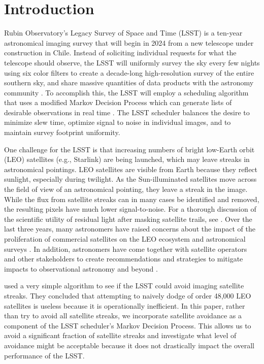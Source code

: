 \documentclass[twocolumn]{aastex631}
\begin{document}
\section{Introduction} \label{sec:intro}

Rubin Observatory's Legacy Survey of Space and Time (LSST) is a ten-year astronomical imaging survey that will begin in 2024 from a new telescope under construction in Chile. Instead of soliciting individual requests for what the telescope should observe, the LSST will uniformly survey the sky every few nights using six color filters to create a decade-long high-resolution survey of the entire southern sky, and share massive quantities of data products with the astronomy community \citep{overview}. To accomplish this, the LSST will employ a scheduling algorithm that uses a modified Markov Decision Process which can generate lists of desirable observations in real time \citep{naghib19}. The LSST scheduler balances the desire to minimize slew time, optimize signal to noise in individual images, and to maintain survey footprint uniformity.

One challenge for the LSST is that increasing numbers of bright low-Earth orbit (LEO) satellites (e.g., Starlink) are being launched, which may leave streaks in astronomical pointings. LEO satellites are visible from Earth because they reflect sunlight, especially during twilight. As the Sun-illuminated satellites move across the field of view of an astronomical pointing, they leave a streak in the image. While the flux from satellite streaks can in many cases be identified and removed, the resulting pixels have much lower signal-to-noise. For a thorough discussion of the scientific utility of residual light after masking satellite trails, see \citet{hasan22}. Over the last three years, many astronomers have raised concerns about the impact of the proliferation of commercial satellites on the LEO ecosystem and astronomical surveys \citep{lawrence22,tyson20}. In addition, astronomers have come together with satellite operators and other stakeholders to create recommendations and strategies to mitigate impacts to observational astronomy and beyond \citep{satcon1,satcon2,dqs1,dqs2}.

\citet{tyson20} used a very simple algorithm to see if the LSST could avoid imaging satellite streaks. They concluded that attempting to naively dodge of order 48,000 LEO satellites is useless because it is operationally inefficient.
In this paper, rather than try to avoid all satellite streaks, we incorporate satellite avoidance as a component of the LSST scheduler's Markov Decision Process. This allows us to avoid a significant fraction of satellite streaks and investigate what level of avoidance might be acceptable because it does not drastically impact the overall performance of the LSST.
\end{document}
